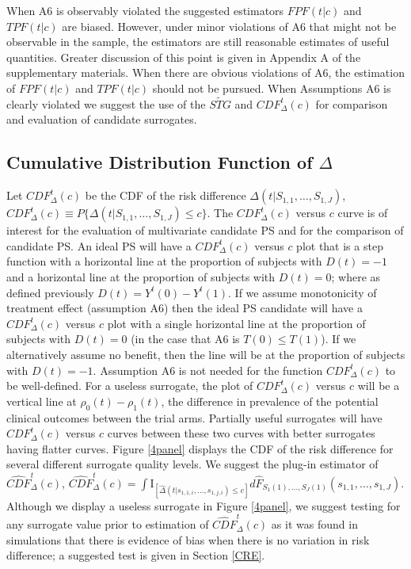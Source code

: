 \documentclass[times, doublespace]{simauth}
\begin{document}
When A6 is observably violated the suggested estimators $FPF(t|c)$ and $TPF(t|c)$ are biased. However, under minor violations of A6 that might not be observable in the sample, the estimators are still reasonable estimates of useful quantities. Greater discussion of this point is given in Appendix A of the supplementary materials. When there are obvious violations of A6, the estimation of $FPF(t|c)$ and $TPF(t|c)$ should not be pursued. When Assumptions A6 is clearly violated we suggest the use of the $\widetilde{STG}$ and $CDF^{t}_{\Delta}(c)$ for comparison and evaluation of candidate surrogates.

\subsection{Cumulative Distribution Function of $\Delta$} \label{CDF}

 Let $CDF^{t}_{\Delta}(c)$ be the CDF of the risk difference $\Delta(t|S_{1,1}, \dots, S_{1,J})$, $CDF^{t}_{\Delta}(c)\equiv P\{\Delta(t|S_{1,1}, \dots, S_{1,J})\leq c\}.$ The $CDF^{t}_{\Delta}(c)$ versus $c$ curve is of interest for the evaluation of multivariate candidate PS and for the comparison of candidate PS. An ideal PS will have a $CDF^{t}_{\Delta}(c)$ versus $c$ plot that is a step function with a horizontal line at the proportion of subjects with $D(t)=-1$ and a horizontal line at the proportion of subjects with $D(t)=0$; where as defined previously $D(t)=Y^{t}(0)-Y^{t}(1)$. If we assume monotonicity of treatment effect (assumption A6) then the ideal PS candidate will have a $CDF^{t}_{\Delta}(c)$ versus $c$ plot with a single horizontal line at the proportion of subjects with $D(t)=0$ (in the case that A6 is $T(0) \leq T(1)$). If we alternatively assume no benefit, then the line will be at the proportion of subjects with $D(t)=-1$. Assumption A6 is not needed for the function $CDF^{t}_{\Delta}(c)$ to be well-defined. For a useless surrogate, the plot of $CDF^{t}_{\Delta}(c)$ versus $c$ will be a vertical line at $\rho_0(t)-\rho_1(t)$, the difference in prevalence of the potential clinical outcomes between the trial arms. Partially useful surrogates will have $CDF^{t}_{\Delta}(c)$ versus $c$ curves between these two curves with better surrogates having flatter curves. Figure \ref{4panel} displays the CDF of the risk difference for several different surrogate quality levels. We suggest the plug-in estimator of $\widehat{CDF}^{t}_{\Delta}(c)$, $\widehat{CDF}^{t}_{\Delta}(c)=\int{\mathrm{I}_{[\hat{\Delta}(t|s_{1,1,i}, \dots, s_{1,j,i})\leq c]} d\hat{F}_{S_1(1), \ldots, S_J(1)}(s_{1,1}, \dots, s_{1,J})}$. Although we display a useless surrogate in Figure \ref{4panel}, we suggest testing for any surrogate value prior to estimation of $\widehat{CDF}^{t}_{\Delta}(c)$ as it was found in simulations that there is evidence of bias when there is no variation in risk difference; a suggested test is given in Section \ref{CRE}.
\end{document}
